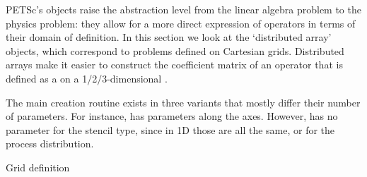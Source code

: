 
PETSc's  objects raise the abstraction level
from the linear algebra problem to the physics problem:
they allow for a more direct expression of operators
in terms of their domain of definition.
In this section we look at the 
`distributed array' objects,
which correspond to problems defined on Cartesian grids.
Distributed arrays make it easier to construct the coefficient matrix
of an operator that is defined as a 
on a 1/2/3-dimensional .

The main creation routine exists in three variants that mostly
differ their number of parameters.
For instance,  has parameters along the
 axes.
However,  has no parameter for the stencil type,
since in 1D those are all the same, or for the process distribution.

 {Grid definition}

